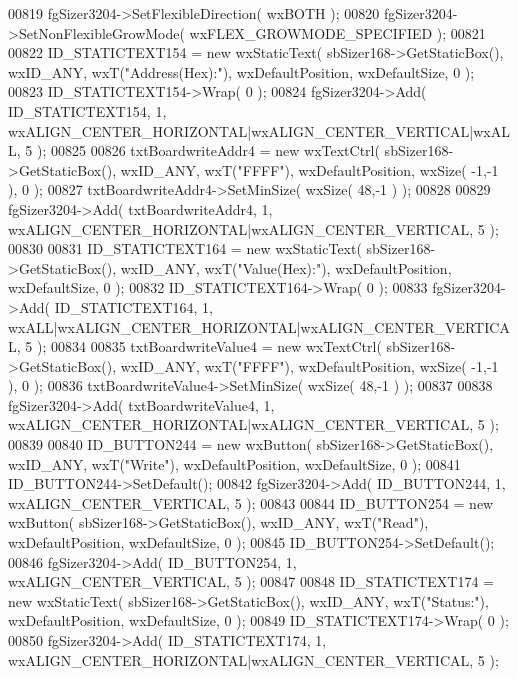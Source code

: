 \begin{DoxyCode}
00819     fgSizer3204->SetFlexibleDirection( wxBOTH );
00820     fgSizer3204->SetNonFlexibleGrowMode( wxFLEX\_GROWMODE\_SPECIFIED );
00821     
00822     ID_STATICTEXT154 = \textcolor{keyword}{new} wxStaticText( sbSizer168->GetStaticBox(), wxID\_ANY, wxT(\textcolor{stringliteral}{"Address(Hex):"}), 
      wxDefaultPosition, wxDefaultSize, 0 );
00823     ID_STATICTEXT154->Wrap( 0 );
00824     fgSizer3204->Add( ID_STATICTEXT154, 1, wxALIGN\_CENTER\_HORIZONTAL|wxALIGN\_CENTER\_VERTICAL|wxALL, 5 );
00825     
00826     txtBoardwriteAddr4 = \textcolor{keyword}{new} wxTextCtrl( sbSizer168->GetStaticBox(), wxID\_ANY, wxT(\textcolor{stringliteral}{"FFFF"}), 
      wxDefaultPosition, wxSize( -1,-1 ), 0 );
00827     txtBoardwriteAddr4->SetMinSize( wxSize( 48,-1 ) );
00828     
00829     fgSizer3204->Add( txtBoardwriteAddr4, 1, wxALIGN\_CENTER\_HORIZONTAL|wxALIGN\_CENTER\_VERTICAL, 5 );
00830     
00831     ID_STATICTEXT164 = \textcolor{keyword}{new} wxStaticText( sbSizer168->GetStaticBox(), wxID\_ANY, wxT(\textcolor{stringliteral}{"Value(Hex):"}), 
      wxDefaultPosition, wxDefaultSize, 0 );
00832     ID_STATICTEXT164->Wrap( 0 );
00833     fgSizer3204->Add( ID_STATICTEXT164, 1, wxALL|wxALIGN\_CENTER\_HORIZONTAL|wxALIGN\_CENTER\_VERTICAL, 5 );
00834     
00835     txtBoardwriteValue4 = \textcolor{keyword}{new} wxTextCtrl( sbSizer168->GetStaticBox(), wxID\_ANY, wxT(\textcolor{stringliteral}{"FFFF"}), 
      wxDefaultPosition, wxSize( -1,-1 ), 0 );
00836     txtBoardwriteValue4->SetMinSize( wxSize( 48,-1 ) );
00837     
00838     fgSizer3204->Add( txtBoardwriteValue4, 1, wxALIGN\_CENTER\_HORIZONTAL|wxALIGN\_CENTER\_VERTICAL, 5 );
00839     
00840     ID_BUTTON244 = \textcolor{keyword}{new} wxButton( sbSizer168->GetStaticBox(), wxID\_ANY, wxT(\textcolor{stringliteral}{"Write"}), wxDefaultPosition, 
      wxDefaultSize, 0 );
00841     ID_BUTTON244->SetDefault(); 
00842     fgSizer3204->Add( ID_BUTTON244, 1, wxALIGN\_CENTER\_VERTICAL, 5 );
00843     
00844     ID_BUTTON254 = \textcolor{keyword}{new} wxButton( sbSizer168->GetStaticBox(), wxID\_ANY, wxT(\textcolor{stringliteral}{"Read"}), wxDefaultPosition, 
      wxDefaultSize, 0 );
00845     ID_BUTTON254->SetDefault(); 
00846     fgSizer3204->Add( ID_BUTTON254, 1, wxALIGN\_CENTER\_VERTICAL, 5 );
00847     
00848     ID_STATICTEXT174 = \textcolor{keyword}{new} wxStaticText( sbSizer168->GetStaticBox(), wxID\_ANY, wxT(\textcolor{stringliteral}{"Status:"}), 
      wxDefaultPosition, wxDefaultSize, 0 );
00849     ID_STATICTEXT174->Wrap( 0 );
00850     fgSizer3204->Add( ID_STATICTEXT174, 1, wxALIGN\_CENTER\_HORIZONTAL|wxALIGN\_CENTER\_VERTICAL, 5 );

\end{DoxyCode}

